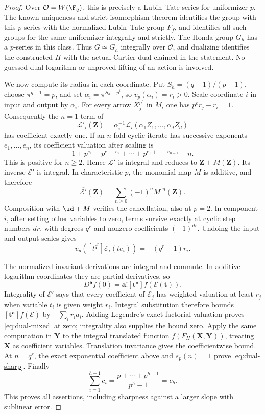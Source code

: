 \begin{proof}
Over $\mathcal O=W(\F_q)$, this is precisely a Lubin--Tate series for uniformizer $p$. The known uniqueness and strict-isomorphism theorem \cite[\S5, pp.~76--77, (5.1)--(5.4)]{Hazewinkel} identifies the group with this $p$-series with the normalized Lubin--Tate group $F_f$, and identifies all such groups for the same uniformizer integrally and strictly. The Honda group $G_h$ has a $p$-series in this class. Thus $G\simeq G_h$ integrally over $\mathcal O$, and dualizing identifies the constructed $H$ with the actual Cartier dual claimed in the statement. No guessed dual logarithm or unproved lifting of an action is involved.

We now compute its radius in each coordinate. Put $S_h=(q-1)/(p-1)$, choose $\pi^{q-1}=p$, and set $\alpha_i=\pi^{S_h-p^i}$, so $v_p(\alpha_i)=r_i>0$. Scale coordinate $i$ in input and output by $\alpha_i$. For every arrow $X_j^{p^e}$ in $M_i$ one has $p^er_j-r_i=1$. Consequently the $n=1$ term of
\[
 \mathcal L'_i(\mathbf Z)=\alpha_i^{-1}\mathcal L_i(\alpha_1Z_1,\ldots,\alpha_dZ_d)
\]
has coefficient exactly one. If an $n$-fold cyclic iterate has successive exponents $e_1,\ldots,e_n$, its coefficient valuation after scaling is
\[
 1+p^{e_1}+p^{e_1+e_2}+\cdots+p^{e_1+\cdots+e_{n-1}}-n.
\]
This is positive for $n\ge2$. Hence $\mathcal L'$ is integral and reduces to $\mathbf Z+M(\mathbf Z)$. Its inverse $\mathcal E'$ is integral. In characteristic $p$, the monomial map $M$ is additive, and therefore
\[
 \overline{\mathcal E'}(\mathbf Z)=\sum_{n\ge0}(-1)^nM^{\circ n}(\mathbf Z).
\]
Composition with $\id+M$ verifies the cancellation, also at $p=2$. In component $i$, after setting other variables to zero, terms survive exactly at cyclic step numbers $dr$, with degrees $q^r$ and nonzero coefficients $(-1)^{dr}$. Undoing the input and output scales gives
\[
 v_p([t^{q^r}]\mathcal E_i(t e_i))=-(q^r-1)r_i.
\]

The normalized invariant derivations are integral and commute. In additive logarithm coordinates they are partial derivatives, so
\[
 D^{\mathbf a}f(0)=\mathbf a![\mathbf t^{\mathbf a}]f(\mathcal E(\mathbf t)).
\]
Integrality of $\mathcal E'$ says that every coefficient of $\mathcal E_j$ has weighted valuation at least $r_j$ when variable $t_i$ is given weight $r_i$. Integral substitution therefore bounds $[\mathbf t^{\mathbf a}]f(\mathcal E)$ by $-\sum_i r_i a_i$. Adding Legendre's exact factorial valuation proves \eqref{eq:dual-mixed} at zero; integrality also supplies the bound zero. Apply the same computation in $\mathbf Y$ to the integral translated function $f(F_H(\mathbf X,\mathbf Y))$, treating $\mathbf X$ as coefficient variables. Translation invariance gives the coefficientwise bound. At $n=q^r$, the exact exponential coefficient above and $s_p(n)=1$ prove \eqref{eq:dual-sharp}. Finally
\[
 \sum_{i=1}^{h-1}c_i=\frac{p+\cdots+p^{h-1}}{p^h-1}=c_h.
\]
This proves all assertions, including sharpness against a larger slope with sublinear error.
\end{proof}
